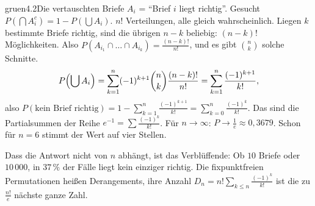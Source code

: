 \begin{loesungkarte}{gruen}{4.2}{Die vertauschten Briefe}
$A_i$ = \enquote{Brief $i$ liegt richtig}. Gesucht $P(\bigcap A_i^{c}) = 1 - P(\bigcup A_i)$.
$n!$ Verteilungen, alle gleich wahrscheinlich. Liegen $k$ bestimmte Briefe richtig, sind die übrigen $n - k$ beliebig: $(n - k)!$ Möglichkeiten. Also $P(A_{i_1}\cap\dots\cap A_{i_k}) = \frac{(n - k)!}{n!}$, und es gibt $\binom nk$ solche Schnitte.
\[ P\Bigl(\bigcup A_i\Bigr) = \sum_{k=1}^{n}(-1)^{k+1}\binom nk\frac{(n - k)!}{n!} = \sum_{k=1}^{n}\frac{(-1)^{k+1}}{k!}, \]
also $P(\text{kein Brief richtig}) = 1 - \sum_{k=1}^{n}\frac{(-1)^{k+1}}{k!} = \sum_{k=0}^{n}\frac{(-1)^{k}}{k!}$.
Das sind die Partialsummen der Reihe $e^{-1} = \sum\frac{(-1)^{k}}{k!}$. Für $n\to\infty$: $P\to\frac1e\approx0{,}3679$. Schon für $n = 6$ stimmt der Wert auf vier Stellen.
\begin{mitnehmen}\kastentext
Dass die Antwort nicht von $n$ abhängt, ist das Verblüffende: Ob $10$ Briefe oder $10\,000$, in $37\,\%$ der Fälle liegt kein einziger richtig. Die fixpunktfreien Permutationen heißen Derangements, ihre Anzahl $D_n = n!\sum_{k\le n}\frac{(-1)^{k}}{k!}$ ist die zu $\frac{n!}e$ nächste ganze Zahl.
\end{mitnehmen}
\end{loesungkarte}

